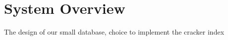 \section{System Overview}
The design of our small database, choice to implement the cracker index
\label{sec:system}
